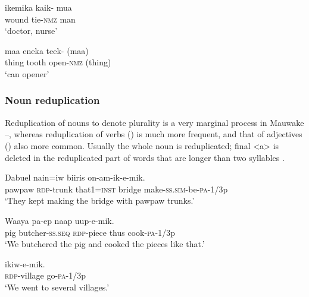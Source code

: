\ea%
\label{ex:3:x1232}
\gll ikemika kaik- mua \\
wound tie-\textsc{nmz} man\\
\glt`doctor, nurse'
\z

\ea%
\label{ex:3:x1233}
\gll maa eneka teek- (maa){\upshape\footnotemark{}} \\
thing tooth open-\textsc{nmz} (thing)\\
\glt`can opener'
\z


\subsubsection{Noun reduplication}\label{sec:3.2.6.2}
{}
Reduplication of nouns to denote plurality is a very marginal process in Mauwake --, whereas reduplication of verbs () is much more frequent, and that of adjectives () also more common. Usually the whole noun is reduplicated; final <a> is deleted in the reduplicated part of words that are longer than two syllables . 

\ea%
\label{ex:3:x68}
\gll Dabuel  nain=iw biiris on-am-ik-e-mik. \\
pawpaw \textsc{rdp}-trunk that1=\textsc{inst} bridge make-\textsc{ss}.\textsc{sim}-be-\textsc{pa}-1/3p\\
\glt`They kept making the bridge with pawpaw trunks.'
\z

\ea%
\label{ex:3:x69}
\gll Waaya pa-ep  naap uup-e-mik. \\
pig butcher-\textsc{ss}.\textsc{seq} \textsc{rdp}-piece thus cook-\textsc{pa}-1/3p\\
\glt`We butchered the pig and cooked the pieces like that.'
\z

\ea%
\label{ex:3:x426}
\gll {} ikiw-e-mik. \\
\textsc{rdp}-village go-\textsc{pa}-1/3p\\
\glt`We went to several villages.'
\z

